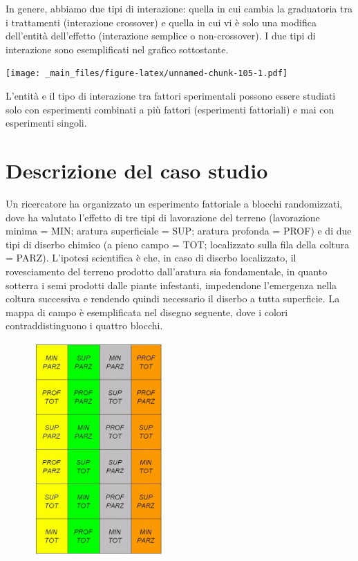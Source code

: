 \documentclass[a4paper,12pt,oneside]{book}
\theoremstyle{definition}
\theoremstyle{definition}
\theoremstyle{definition}
\theoremstyle{remark}
\begin{document}
In genere, abbiamo due tipi di interazione: quella in cui cambia la
graduatoria tra i trattamenti (interazione crossover) e quella in cui vi
è solo una modifica dell'entità dell'effetto (interazione semplice o
non-crossover). I due tipi di interazione sono esemplificati nel grafico
sottostante.

\texttt{[image: \_main\_files/figure-latex/unnamed-chunk-105-1.pdf]}

L'entità e il tipo di interazione tra fattori sperimentali possono
essere studiati solo con esperimenti combinati a più fattori
(esperimenti fattoriali) e mai con esperimenti singoli.

\section{Descrizione del caso studio}\label{descrizione-del-caso-studio}

Un ricercatore ha organizzato un esperimento fattoriale a blocchi
randomizzati, dove ha valutato l'effetto di tre tipi di lavorazione del
terreno (lavorazione minima = MIN; aratura superficiale = SUP; aratura
profonda = PROF) e di due tipi di diserbo chimico (a pieno campo = TOT;
localizzato sulla fila della coltura = PARZ). L'ipotesi scientifica è
che, in caso di diserbo localizzato, il rovesciamento del terreno
prodotto dall'aratura sia fondamentale, in quanto sotterra i semi
prodotti dalle piante infestanti, impedendone l'emergenza nella coltura
successiva e rendendo quindi necessario il diserbo a tutta superficie.
La mappa di campo è esemplificata nel disegno seguente, dove i colori
contraddistinguono i quattro blocchi.

\begin{figure}
\centering
\includegraphics[width=0.45000\textwidth]{_images/SchemaFattorialeBlocchi.jpg}
\caption{}
\end{figure}
\end{document}
